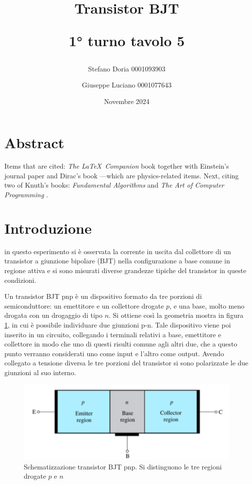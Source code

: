 \documentclass[a4paper,11pt]{article}
\begin{document}
\title{\textbf{Transistor BJT}

1° turno tavolo 5}
\author{Stefano Doria 0001093903 \and Giuseppe Luciano 0001077643}

\date{Novembre 2024}

\maketitle

\section{Abstract}

Items that are cited: \textit{The \LaTeX\ Companion} book \cite{latexcompanion} together with Einstein's journal paper \cite{einstein} and Dirac's book \cite{dirac}---which are physics-related items. Next, citing two of Knuth's books: \textit{Fundamental Algorithms} \cite{knuth-fa} and \textit{The Art of Computer Programming} \cite{knuth-acp}.

\section{Introduzione}
in questo esperimento si è osservata la corrente in uscita dal collettore di un transistor a giunzione bipolare (BJT) nella configurazione a base comune in regione attiva e si sono misurati diverse grandezze tipiche del transistor in queste condizioni.

Un transistor BJT pnp è un dispositivo formato da tre porzioni di semiconduttore: un emettitore e un collettore drogate $p$, e una base, molto meno drogata con un drogaggio di tipo $n$. Si ottiene così la geometria mostra in figura \ref{fig::pnp}, in cui è possibile individuare due giunzioni p-n. Tale dispositivo viene poi inserito in un circuito, collegando i terminali relativi a base, emettitore e collettore in modo che uno di questi risulti comune agli altri due, che a questo punto verranno considerati uno come input e l'altro come output. Avendo collegato a tensione diversa le tre porzioni del transistor si sono polarizzate le due giunzioni al suo interno.

\begin{figure}[ht]
\centering
    \includegraphics[width=0.7\linewidth]{pictures/pnp.png}
    \caption{Schematizzazione transistor BJT pnp. Si distinguono le tre regioni drogate $p$ e $n$}
    \label{fig::pnp} 
\end{figure}
\end{document}
